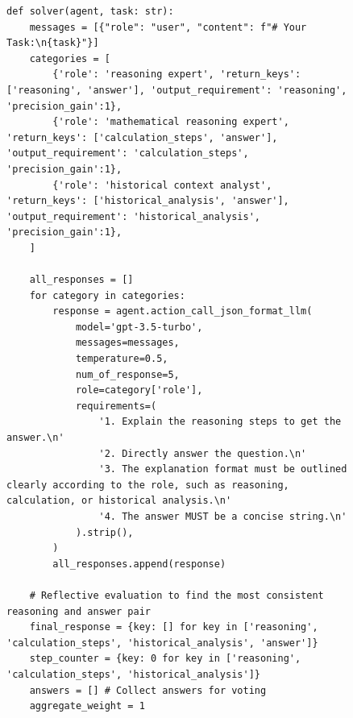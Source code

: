 \begin{figure}[ht]
\begin{lstlisting}[style=pythonstyle, caption={Code of the best policy found by \framework for DROP.}]
def solver(agent, task: str):
    messages = [{"role": "user", "content": f"# Your Task:\n{task}"}]
    categories = [
        {'role': 'reasoning expert', 'return_keys': ['reasoning', 'answer'], 'output_requirement': 'reasoning', 'precision_gain':1},
        {'role': 'mathematical reasoning expert', 'return_keys': ['calculation_steps', 'answer'], 'output_requirement': 'calculation_steps', 'precision_gain':1},
        {'role': 'historical context analyst', 'return_keys': ['historical_analysis', 'answer'], 'output_requirement': 'historical_analysis', 'precision_gain':1},
    ]

    all_responses = []
    for category in categories:
        response = agent.action_call_json_format_llm(
            model='gpt-3.5-turbo', 
            messages=messages, 
            temperature=0.5, 
            num_of_response=5, 
            role=category['role'], 
            requirements=(
                '1. Explain the reasoning steps to get the answer.\n' 
                '2. Directly answer the question.\n' 
                '3. The explanation format must be outlined clearly according to the role, such as reasoning, calculation, or historical analysis.\n' 
                '4. The answer MUST be a concise string.\n'
            ).strip(),
        )
        all_responses.append(response)

    # Reflective evaluation to find the most consistent reasoning and answer pair
    final_response = {key: [] for key in ['reasoning', 'calculation_steps', 'historical_analysis', 'answer']}
    step_counter = {key: 0 for key in ['reasoning', 'calculation_steps', 'historical_analysis']}
    answers = [] # Collect answers for voting
    aggregate_weight = 1


\end{lstlisting}
\end{figure}
